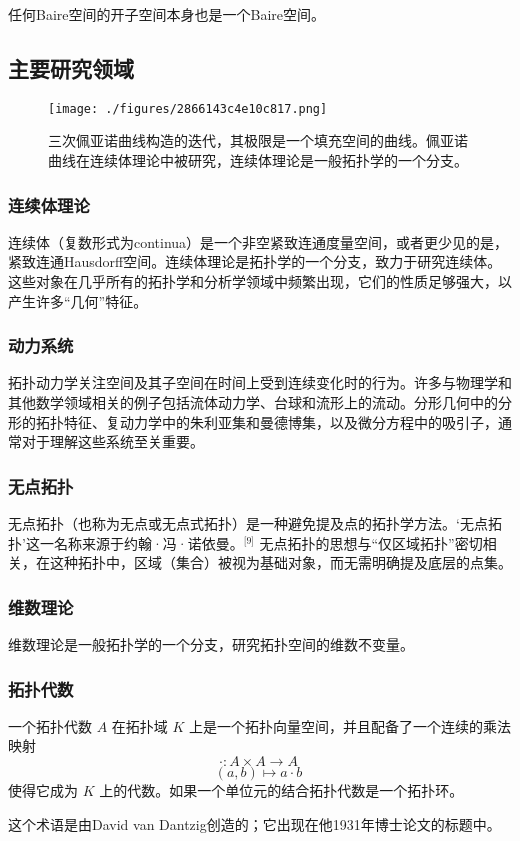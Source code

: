 任何Baire空间的开子空间本身也是一个Baire空间。
\subsection{主要研究领域}
\begin{figure}[ht]
\centering
\texttt{[image: ./figures/2866143c4e10c817.png]}
\caption{三次佩亚诺曲线构造的迭代，其极限是一个填充空间的曲线。佩亚诺曲线在连续体理论中被研究，连续体理论是一般拓扑学的一个分支。} \label{fig_DJTP_3}
\end{figure}
\subsubsection{连续体理论}
连续体（复数形式为continua）是一个非空紧致连通度量空间，或者更少见的是，紧致连通Hausdorff空间。连续体理论是拓扑学的一个分支，致力于研究连续体。这些对象在几乎所有的拓扑学和分析学领域中频繁出现，它们的性质足够强大，以产生许多“几何”特征。
\subsubsection{动力系统}
拓扑动力学关注空间及其子空间在时间上受到连续变化时的行为。许多与物理学和其他数学领域相关的例子包括流体动力学、台球和流形上的流动。分形几何中的分形的拓扑特征、复动力学中的朱利亚集和曼德博集，以及微分方程中的吸引子，通常对于理解这些系统至关重要。
\subsubsection{无点拓扑}
无点拓扑（也称为无点或无点式拓扑）是一种避免提及点的拓扑学方法。‘无点拓扑’这一名称来源于约翰·冯·诺依曼。\(^\text{[9]}\) 无点拓扑的思想与“仅区域拓扑”密切相关，在这种拓扑中，区域（集合）被视为基础对象，而无需明确提及底层的点集。
\subsubsection{维数理论}
维数理论是一般拓扑学的一个分支，研究拓扑空间的维数不变量。
\subsubsection{拓扑代数}
一个拓扑代数 $A$ 在拓扑域 $K$ 上是一个拓扑向量空间，并且配备了一个连续的乘法映射
$$
\cdot : A \times A \longrightarrow A~
$$
$$
(a,b) \longmapsto a \cdot b~
$$
使得它成为 $K$ 上的代数。如果一个单位元的结合拓扑代数是一个拓扑环。

这个术语是由David van Dantzig创造的；它出现在他1931年博士论文的标题中。
